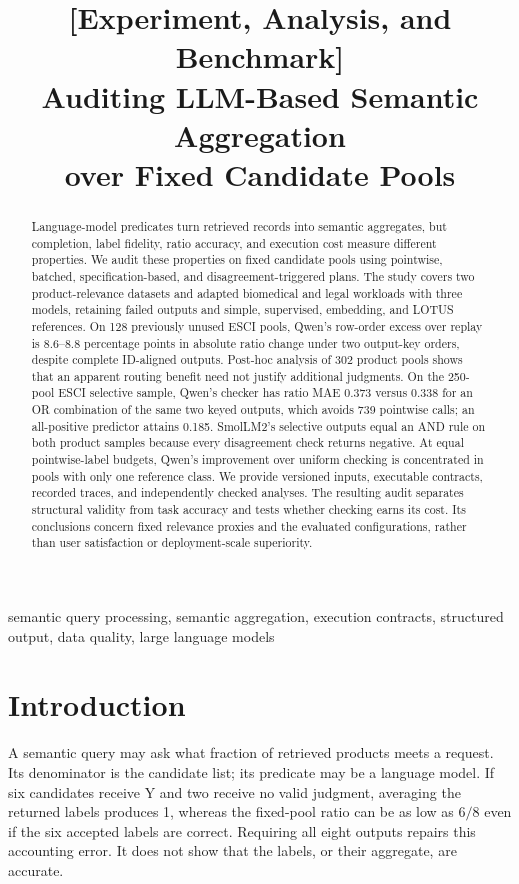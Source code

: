\documentclass[conference]{IEEEtran}
\begin{document}
\title{[Experiment, Analysis, and Benchmark]\\Auditing LLM-Based Semantic Aggregation\\over Fixed Candidate Pools}
\author{}
\maketitle
\begin{abstract}
Language-model predicates turn retrieved records into semantic aggregates, but completion, label fidelity, ratio accuracy, and execution cost measure different properties. We audit these properties on fixed candidate pools using pointwise, batched, specification-based, and disagreement-triggered plans. The study covers two product-relevance datasets and adapted biomedical and legal workloads with three models, retaining failed outputs and simple, supervised, embedding, and LOTUS references. On 128 previously unused ESCI pools, Qwen's row-order excess over replay is 8.6--8.8 percentage points in absolute ratio change under two output-key orders, despite complete ID-aligned outputs. Post-hoc analysis of 302 product pools shows that an apparent routing benefit need not justify additional judgments. On the 250-pool ESCI selective sample, Qwen's checker has ratio MAE 0.373 versus 0.338 for an OR combination of the same two keyed outputs, which avoids 739 pointwise calls; an all-positive predictor attains 0.185. SmolLM2's selective outputs equal an AND rule on both product samples because every disagreement check returns negative. At equal pointwise-label budgets, Qwen's improvement over uniform checking is concentrated in pools with only one reference class. We provide versioned inputs, executable contracts, recorded traces, and independently checked analyses. The resulting audit separates structural validity from task accuracy and tests whether checking earns its cost. Its conclusions concern fixed relevance proxies and the evaluated configurations, rather than user satisfaction or deployment-scale superiority.

\end{abstract}
\begin{IEEEkeywords}
semantic query processing, semantic aggregation, execution contracts, structured output, data quality, large language models
\end{IEEEkeywords}

\section{Introduction}
A semantic query may ask what fraction of retrieved products meets a request. Its denominator is the candidate list; its predicate may be a language model. If six candidates receive Y and two receive no valid judgment, averaging the returned labels produces 1, whereas the fixed-pool ratio can be as low as $6/8$ even if the six accepted labels are correct. Requiring all eight outputs repairs this accounting error. It does not show that the labels, or their aggregate, are accurate.
\end{document}
